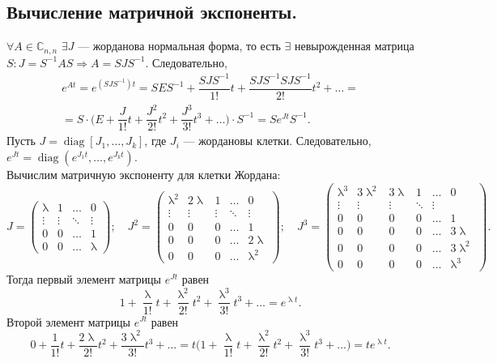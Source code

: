 \documentclass[a4paper, 12pt]{report}
\newcommand{\Cm}{\mathbb{C}}
\renewcommand{\lambda}{\uplambda}
\begin{document}
\subsection*{Вычисление матричной экспоненты.}
$\forall A \in \Cm_{n,n}$ $\exists J$ --- жорданова нормальная форма, то есть $\exists$ невырожденная матрица $S: J = S^{-1}AS \Rightarrow A = S JS^{-1}$. Следовательно, \begin{multline*}
	e^{At} = e^{(SJS^{-1})t} = SES^{-1} + \dfrac{SJS^{-1}}{1!}t + \dfrac{SJS^{-1}SJS^{-1}}{2!}t^2 + \ldots =\\= S\cdot \Big(E + \dfrac{J}{1!}t + \dfrac{J^2}{2!}t^2 + \dfrac{J^3}{3!}t^3 + \ldots\Big)\cdot S^{-1} = Se^{Jt}S^{-1}.
\end{multline*}
Пусть $J = \operatorname{diag}[J_1,\ldots,J_k]$, где $J_i$ --- жордановы клетки. Следовательно, $e^{Jt} = \operatorname{diag}(e^{J_1t},\ldots,e^{J_kt})$.\\
Вычислим матричную экспоненту для клетки Жордана:
$$J = \begin{pmatrix}
	\lambda & 1 & \dots & 0\\
	\vdots & \vdots & \ddots & \vdots\\
	0 & 0 & \dots & 1\\
	0 & 0 & \dots & \lambda
\end{pmatrix};\quad J^2 = \begin{pmatrix}
\lambda^2 & 2\lambda & 1 & \dots & 0\\
\vdots & \vdots & \vdots & \ddots & \vdots\\
0 & 0 & 0 & \dots & 1\\
0 & 0 & 0 & \dots & 2\lambda\\
0 & 0 & 0 & \dots & \lambda^2
\end{pmatrix};\quad J^3 = \begin{pmatrix}
\lambda^3 & 3\lambda^2 & 3\lambda & 1 & \dots & 0\\
\vdots & \vdots & \vdots & \ddots & \vdots\\
0 & 0 & 0 & 0 & \dots & 1\\
0 & 0 & 0 & 0 & \dots & 3\lambda\\
0 & 0 & 0 & 0 & \dots & 3\lambda^2\\
0 & 0 & 0 & 0 & \dots & \lambda^3
\end{pmatrix}.$$
Тогда первый элемент матрицы $e^{Jt}$ равен $$1 + \dfrac{\lambda}{1!}t + \dfrac{\lambda^2}{2!}t^2 + \dfrac{\lambda^3}{3!}t^3 + \ldots = e^{\lambda t}.$$
Второй элемент матрицы $e^{Jt}$ равен $$0 + \dfrac{1}{1!}t + \dfrac{2\lambda}{2!}t^2 + \dfrac{3\lambda^2}{3!}t^3 + \ldots  = t \Big(1 + \dfrac{\lambda}{1!}t + \dfrac{\lambda^2}{2!}t^2 + \dfrac{\lambda^3}{3!}t^3 + \ldots\Big)= te^{\lambda t}.$$
\end{document}
